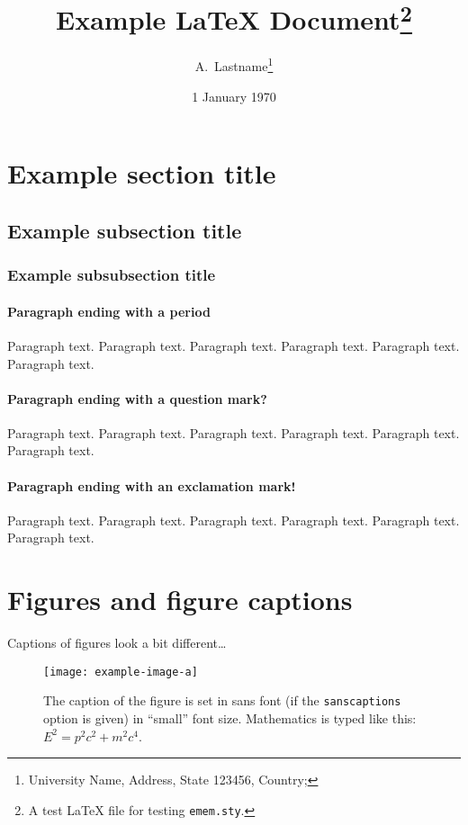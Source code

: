 \documentclass{article}
\title[Custom Head Title Appears Here]{Example {\LaTeX} Document\thanks{A test {\LaTeX} file for testing \texttt{emem.sty}.}}
\author{A.~Lastname\thanks{University Name, Address, State 123456, Country; \email{a.lastname@mail.zz}}}
\date{1 January 1970}
\begin{document}
\maketitle

\begin{abstract}
  \lipsum[1]
\end{abstract}

\tableofcontents

\section{Example section title}
\lipsum[1]

\subsection{Example subsection title}
\lipsum[2]

\subsubsection{Example subsubsection title}
\lipsum[3]

\paragraph{Paragraph ending with a period}
Paragraph text.
Paragraph text.
Paragraph text.
Paragraph text.
Paragraph text.
Paragraph text.

\paragraph{Paragraph ending with a question mark?}
Paragraph text.
Paragraph text.
Paragraph text.
Paragraph text.
Paragraph text.
Paragraph text.

\paragraph{Paragraph ending with an exclamation mark!}
Paragraph text.
Paragraph text.
Paragraph text.
Paragraph text.
Paragraph text.
Paragraph text.



\lipsum[5-8]

\section{Figures and figure captions}

Captions of figures look a bit different\ldots
\begin{figure}
  \begin{center}
    \texttt{[image: example-image-a]}
  \end{center}
  \caption{The caption of the figure is set in sans font (if the \texttt{sanscaptions} option is given) in ``small'' font size.  Mathematics is typed like this: $E^2=p^2c^2 + m^2c^4$.}
\end{figure}
\end{document}

